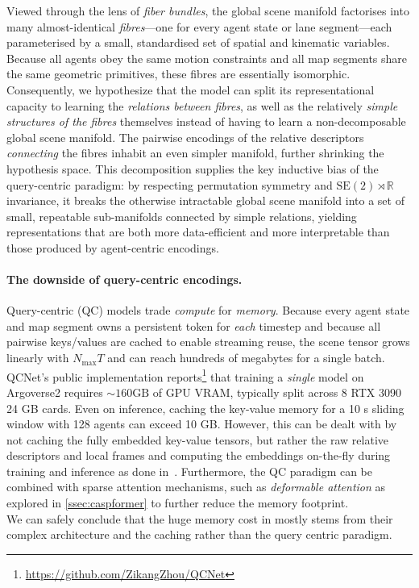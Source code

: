 Viewed through the lens of \emph{fiber bundles}, the global scene manifold factorises into many almost-identical \emph{fibres}—one for every agent state or lane segment—each parameterised by a small, standardised set of spatial and kinematic variables. Because all agents obey the same motion constraints and all map segments share the same geometric primitives, these fibres are essentially isomorphic.\\
Consequently, we hypothesize that the model can split its representational capacity to learning the \emph{relations between fibres}, as well as the relatively \emph{simple structures of the fibres} themselves instead of having to learn a non-decomposable global scene manifold.
The pairwise encodings of the relative descriptors \emph{connecting} the fibres inhabit an even simpler manifold, further shrinking the hypothesis space. This decomposition supplies the key inductive bias of the query-centric paradigm: by respecting permutation symmetry and \(\mathrm{SE}(2)\!\rtimes\!\mathbb{R}\) invariance, it breaks the otherwise intractable global scene manifold into a set of small, repeatable sub-manifolds connected by simple relations, yielding representations that are both more data-efficient and more interpretable than those produced by agent-centric encodings.

\paragraph{The downside of query-centric encodings.}
Query-centric (QC) models trade \emph{compute} for \emph{memory}.
Because every agent state and map segment owns a persistent token for \emph{each} timestep and because all pairwise keys/values are cached to enable streaming reuse, the scene tensor grows linearly with $N_{\max}T$ and can reach hundreds of megabytes for a single batch.
QCNet's public implementation reports\footnote{\url{https://github.com/ZikangZhou/QCNet}\label{fn:qcnet_repo}} that training a \emph{single} model on Argoverse2 requires \(\sim\!160\text{GB}\) of GPU VRAM, typically split across 8 RTX 3090\,24 GB cards.
Even on inference, caching the key-value memory for a 10 s sliding window with 128 agents can exceed 10 GB.
However, this can be dealt with by not caching the fully embedded key-value tensors, but rather the raw relative descriptors and local frames and computing the embeddings on-the-fly during training and inference as done in~\cite{lmformerYadav2025}. Furthermore, the QC paradigm can be combined with sparse attention mechanisms, such as \emph{deformable attention} as explored in \autoref{ssec:caspformer} to further reduce the memory footprint.\\
We can safely conclude that the huge memory cost in \cite{qcnetZhou2023} mostly stems from their complex architecture and the caching rather than the query centric paradigm.